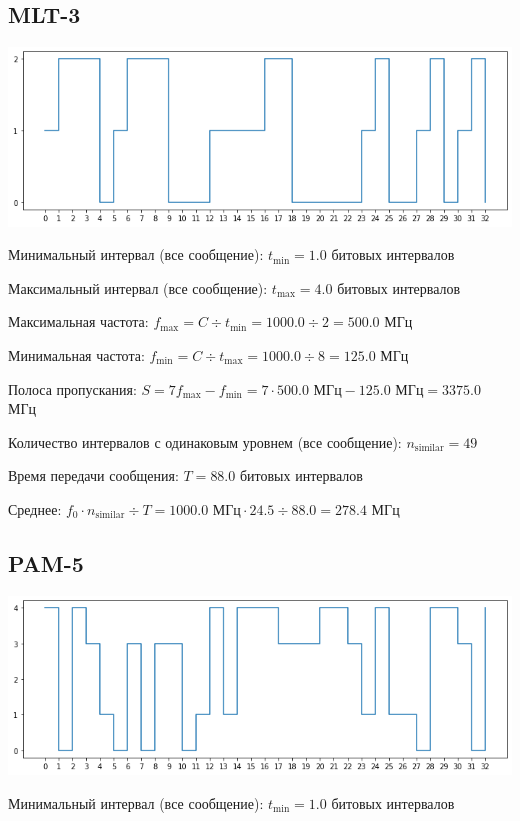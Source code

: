 \subsection{MLT-3}
\includegraphics[width=\textwidth]{3mlt3}

Минимальный интервал (все сообщение): $t_\mathrm{min}=1.0$ битовых интервалов

Максимальный интервал (все сообщение): $t_\mathrm{max}=4.0$ битовых интервалов

Максимальная частота: $f_\mathrm{max}=C\div t_\mathrm{min}=1000.0\div 2=500.0$ МГц

Минимальная частота: $f_\mathrm{min}=C\div t_\mathrm{max}=1000.0\div 8=125.0$ МГц

Полоса пропускания: $S=7f_\mathrm{max}-f_\mathrm{min} = 7\cdot 500.0\text{ МГц}-125.0\text{ МГц}=3375.0$ МГц

Количество интервалов с одинаковым уровнем (все сообщение): $n_\mathrm{similar}=49$

Время передачи сообщения: $T=88.0$ битовых интервалов

Среднее: $f_0\cdot n_\mathrm{similar}\div T=1000.0\text{ МГц}\cdot 24.5\div 88.0=278.4$ МГц

\subsection{PAM-5}
\includegraphics[width=\textwidth]{3pam5}

Минимальный интервал (все сообщение): $t_\mathrm{min}=1.0$ битовых интервалов

